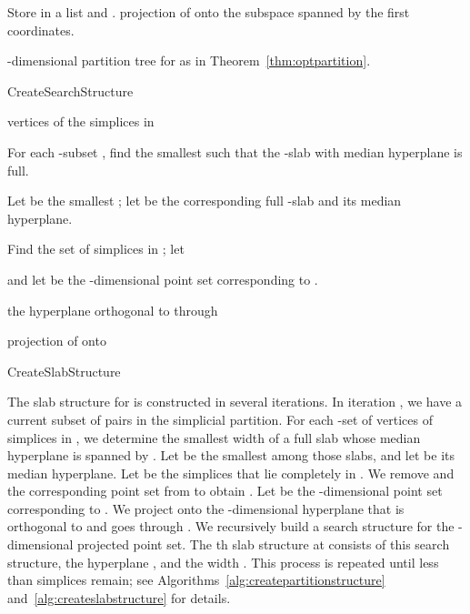 \documentclass[a4paper,11pt]{paper}
\newenvironment{alg}{\begin{algorithm}[htbp]}{\end{algorithm}}
\begin{document}
\begin{alg}
\If{} {
Store  in a list and \Return.
}
 projection of  onto the subspace  spanned by the
first  coordinates.

 -dimensional partition tree for  as
in Theorem~\ref{thm:optpartition}.

\If{} {
}
 \caption{CreateSearchStructure}
 \label{alg:createpartitionstructure}
\end{alg}

\begin{alg}
  \DontPrintSemicolon
  \Input{}

   vertices of the simplices in 

  For each -subset , find the
  smallest  such that the -slab with median
  hyperplane  is full.

  Let  be the smallest ; let  be the
  corresponding full -slab and  its median
  hyperplane.

  Find the set  of  simplices
  in ; let
  
  and let  be the -dimensional point set
  corresponding to .

   the hyperplane orthogonal to  through 

   projection of  onto 

  \CreateSearchStructure{}
  \caption{CreateSlabStructure}
  \label{alg:createslabstructure}
\end{alg}

The slab structure for  is constructed in several iterations.
In iteration , we have a current subset 
of pairs in the simplicial partition.
For each -set  of vertices
of simplices in , we determine the smallest
width of a full slab whose median hyperplane is
spanned by . Let  be the smallest among those slabs,
and let  be its median hyperplane.
Let  be the  simplices that lie completely
in .  We remove  and the corresponding point
set 
from  to obtain . Let
 be the
-dimensional point set corresponding to .
We project  onto the -dimensional
hyperplane  that is orthogonal to  and goes through
. We recursively
build a search structure for the -dimensional projected
point set. The th slab structure  at  consists of this
search structure, the hyperplane
, and the width . This process is repeated until less than
 simplices remain; see
Algorithms~\ref{alg:createpartitionstructure}
and~\ref{alg:createslabstructure} for details.
\end{document}

